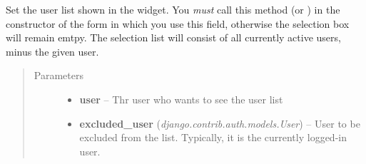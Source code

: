\documentclass[a4paper,11pt,english]{sphinxmanual}
\begin{document}
\begin{fulllineitems}
\begin{fulllineitems}
\label{programming/utilities:jb_common.utils.views.UserField.set_users_without}
Set the user list shown in the widget.  You \emph{must} call this method (or
{\hyperref[programming/utilities:jb_common.utils.views.UserField.set_users]{}}) in the
constructor of the form in which you use this field, otherwise the
selection box will remain emtpy.  The selection list will consist of
all currently active users, minus the given user.
\begin{quote}\begin{description}
\item[{Parameters}] \leavevmode\begin{itemize}
\item {} 
\textbf{user} -- Thr user who wants to see the user list

\item {} 
\textbf{excluded\_user} (\emph{django.contrib.auth.models.User}) -- User to be excluded from the list.  Typically, it
is the currently logged-in user.

\end{itemize}

\end{description}\end{quote}

\end{fulllineitems}


\end{fulllineitems}

\end{document}
